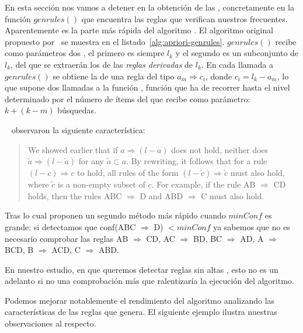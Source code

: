 En esta sección nos vamos a detener en la obtención de las \ars, concretamente en la función $genrules()$ que encuentra las reglas que verifican nuestros \itemsets frecuentes. Aparentemente es la parte más rápida del algoritmo \apriori. El algoritmo original propuesto por~\citet{AgrawalSrikant-FastAlgorithmsForMiningAssociationRules-1994} se muestra en el listado~\ref{alg:apriori-genrules}. $genrules()$ recibe como parámetros dos \kitemsets, el primero es siempre $l_k$ y el segundo es un subconjunto de $l_k$, del que se extraerán los \antecedentes de las \emph{reglas derivadas} de $l_k$. En cada llamada a $genrules()$ se obtiene la \confianza de una regla del tipo $a_m \Rightarrow c_i$, donde $c_i = l_k - a_m$, lo que supone dos llamadas a la función \soporte, función que ha de recorrer \aprioriL hasta el nivel determinado por el número de ítems del \kitemset que recibe como parámetro: $k + (k - m)$ búsquedas.





~\citeauthor{AgrawalSrikant-FastAlgorithmsForMiningAssociationRules-1994} observaron la siguiente característica:

\begin{quote}%
We showed earlier that if $a \Rightarrow (l - a)$ does not hold, neither does $\tilde{a} \Rightarrow (l - \tilde{a})$ for any $\tilde{a} \subset a$. By rewriting, it follows that for a rule $(l - c) \Rightarrow c$ to hold, all rules of the form $(l - \tilde{c}) \Rightarrow \tilde{c}$ must also hold, where $\tilde{c}$ is a non-empty subset of $c$. For example, if the rule AB $\Rightarrow$ CD holds, then the rules ABC $\Rightarrow$ D and ABD $\Rightarrow$ C must also hold.
\end{quote}

Tras lo cual proponen un segundo método más rápido cuando $minConf$ es grande: si detectamos que conf(ABC $\Rightarrow$ D) $< minConf$ ya sabemos que no es necesario comprobar las reglas AB $\Rightarrow$ CD, AC $\Rightarrow$ BD, BC $\Rightarrow$ AD, A $\Rightarrow$ BCD, B $\Rightarrow$ ACD, C $\Rightarrow$ ABD.

En nuestro estudio, en que queremos detectar reglas sin altas \confianzas, esto no es un adelanto si no una comprobación más que ralentizaría la ejecución del algoritmo.

Podemos mejorar notablemente el rendimiento del algoritmo analizando las características de las reglas que genera. El siguiente ejemplo ilustra nuestras observaciones al respecto.

